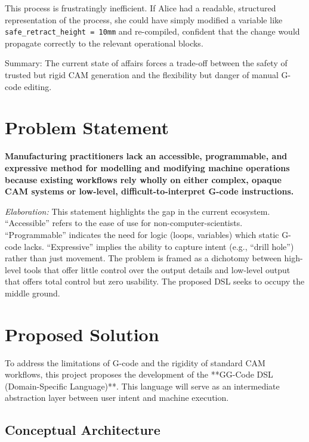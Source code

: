 This process is frustratingly inefficient. If Alice had a readable, structured representation of the process, she could have simply modified a variable like \texttt{safe\_retract\_height = 10mm} and re-compiled, confident that the change would propagate correctly to the relevant operational blocks.

Summary: The current state of affairs forces a trade-off between the safety of trusted but rigid CAM generation and the flexibility but danger of manual G-code editing.

\section{Problem Statement}

\textbf{Manufacturing practitioners lack an accessible, programmable, and expressive method for modelling and modifying machine operations because existing workflows rely wholly on either complex, opaque CAM systems or low-level, difficult-to-interpret G-code instructions.}

\textit{Elaboration:} This statement highlights the gap in the current ecosystem. ``Accessible'' refers to the ease of use for non-computer-scientists. ``Programmable'' indicates the need for logic (loops, variables) which static G-code lacks. ``Expressive'' implies the ability to capture intent (e.g., ``drill hole'') rather than just movement. The problem is framed as a dichotomy between high-level tools that offer little control over the output details and low-level output that offers total control but zero usability. The proposed DSL seeks to occupy the middle ground.

\section{Proposed Solution}

To address the limitations of G-code and the rigidity of standard CAM workflows, this project proposes the development of the **GG-Code DSL (Domain-Specific Language)**. This language will serve as an intermediate abstraction layer between user intent and machine execution.

\subsection{Conceptual Architecture}

